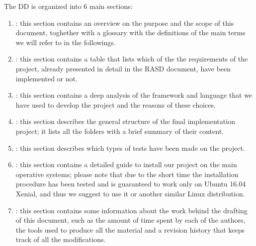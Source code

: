 The DD is organized into 6 main sections:

\begin{enumerate}
\item {\textbf{}}: this section contains an overview on the purpose and the scope of this document, toghether with a glossary with the definitions of the main terms we will refer to in the followings.
\item {\textbf{}}: this section contains a table that lists which of the the requirements of the project, already presented in detail in the RASD document, have been implemented or not.
\item {\textbf{}}: this section contains a deep analysis of the framework and language that we have used to develop the project and the reasons of these choices.
\item {\textbf{}}: this section describes the general structure of the final implementation project; it lists all the folders with a brief summary of their content.
\item {\textbf{}}: this section describes which types of tests have been made on the project.
\item {\textbf{}}: this section contains a detailed guide to install our project on the main operative systems; please note that due to the short time the installation procedure has been tested and is guaranteed to work only on Ubuntu 16.04 Xenial, and thus we suggest to use it or another similar Linux distribution.
\item {\textbf{}}: this section contains some information about the work behind the drafting of this
document, such as the amount of time spent by each of the authors, the tools used to produce all
the material and a revision history that keeps track of all the modifications.
\end{enumerate}